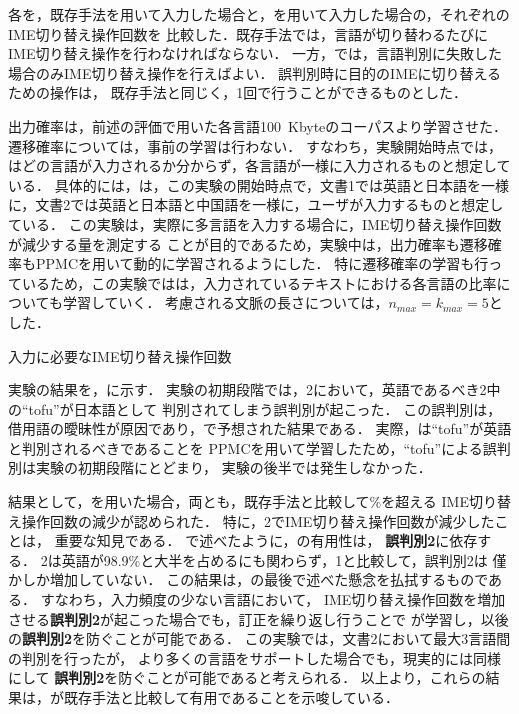 \documentclass[japanese]{jnlp_1.4}
\newcommand{\name}{}
\newcommand{\secref}[1]{}
\newcommand{\tabref}[1]{}
\renewcommand{\text}{}
\newcommand{\decreaserate}{}
\begin{document}
各{\text}を，既存手法を用いて入力した場合と，{\name}を用いて入力した場合の，それぞれのIME切り替え操作回数を
比較した．既存手法では，言語が切り替わるたびにIME切り替え操作を行わなければならない．
一方，{\name}では，言語判別に失敗した場合のみIME切り替え操作を行えばよい．
誤判別時に目的のIMEに切り替えるための操作は，
既存手法と同じく，1回で行うことができるものとした．

出力確率は，前述の評価で用いた各言語100~Kbyteのコーパスより学習させた．
遷移確率については，事前の学習は行わない．
すなわち，実験開始時点では，{\name}はどの言語が入力されるか分からず，各言語が一様に入力されるものと想定している．
具体的には，{\name}は，この実験の開始時点で，文書1では英語と日本語を一様に，文書2では英語と日本語と中国語を一様に，ユーザが入力するものと想定している．
この実験は，実際に多言語{\text}を入力する場合に，IME切り替え操作回数が減少する量を測定する
ことが目的であるため，実験中は，出力確率も遷移確率もPPMCを用いて動的に学習されるようにした．
特に遷移確率の学習も行っているため，この実験では{\name}は，入力されているテキストにおける各言語の比率についても学習していく．
考慮される文脈の長さについては，$n_{max}=k_{max}=5$とした．

\begin{table}[t] 
  \caption{{\text}入力に必要なIME切り替え操作回数} 
  \label{tab:decreaseresult} 
  \begin{center} 

  \end{center} 
\end{table}

実験の結果を，\tabref{tab:decreaseresult}に示す．
実験の初期段階では，{\text}2において，英語であるべき{\text}2中の``tofu''が日本語として
判別されてしまう誤判別が起こった．
この誤判別は，借用語の曖昧性が原因であり，\secref{sec:design}で予想された結果である．
実際，{\name}は``tofu''が英語と判別されるべきであることを
PPMCを用いて学習したため，``tofu''による誤判別は実験の初期段階にとどまり，
実験の後半では発生しなかった．

結果として，{\name}を用いた場合，両{\text}とも，既存手法と比較して\decreaserate\%を超える
IME切り替え操作回数の減少が認められた．
特に，{\text}2でIME切り替え操作回数が減少したことは，
重要な知見である．
\secref{sec:design}で述べたように，{\name}の有用性は，
{\bf 誤判別2}に依存する．
{\text}2は英語が{98.9\%}と大半を占めるにも関わらず，{\text}1と比較して，誤判別2は
僅かしか増加していない．
この結果は，\secref{sec:design}の最後で述べた懸念を払拭するものである．
すなわち，入力頻度の少ない言語において，
IME切り替え操作回数を増加させる{\bf 誤判別2}が起こった場合でも，訂正を繰り返し行うことで{\name}
が学習し，以後の{\bf 誤判別2}を防ぐことが可能である．
この実験では，文書2において最大3言語間の判別を行ったが，
より多くの言語をサポートした場合でも，現実的には同様にして
{\bf 誤判別2}を防ぐことが可能であると考えられる．
以上より，これらの結果は，{\name}が既存手法と比較して有用であることを示唆している．
\end{document}
